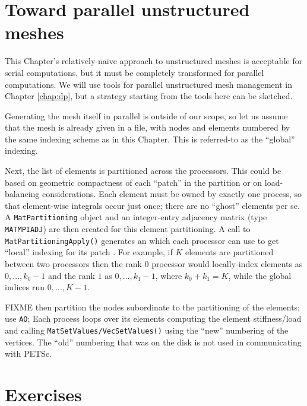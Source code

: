 \section{Toward parallel unstructured meshes}

This Chapter's relatively-naive approach to unstructured meshes is acceptable for serial computations, but it must be completely transformed for parallel computations.  We will use \PETSc tools for parallel unstructured mesh management in Chapter \ref{chap:dp}, but a strategy starting from the tools here can be sketched.

Generating the mesh itself in parallel is outside of our scope,
so let us assume that the mesh is already given in a file, with nodes and elements numbered by the same indexing scheme as in this Chapter.  This is referred-to as the ``global'' indexing.

Next, the list of elements is partitioned across the processors.  This could be based on geometric compactness of each ``patch'' in the partition or on load-balancing considerations.  Each element must be owned by exactly one process, so that element-wise integrals occur just once; there are no ``ghost'' elements per se.  A \texttt{MatPartitioning} object and an integer-entry adjacency matrix (type \texttt{MATMPIADJ}) are then created for this element partitioning.  A call to \texttt{MatPartitioningApply()} generates an \pIS which each processor can use to get ``local'' indexing for its patch \citep{petsc-user-ref}.  For example, if $K$ elements are partitioned between two processors then the rank $0$ processor would locally-index elements as $0,\dots,k_0-1$ and the rank $1$ as $0,\dots,k_1-1$, where $k_0+k_1=K$, while the global indices run $0,\dots,K-1$.

FIXME then partition the nodes subordinate to the partitioning of the elements; use \texttt{AO}; Each process loops over its elements computing the element stiffness/load and calling \texttt{MatSetValues/VecSetValues()} using the ``new'' numbering of the vertices.  The ``old'' numbering that was on the disk is not used in communicating with PETSc.



\section{Exercises}

